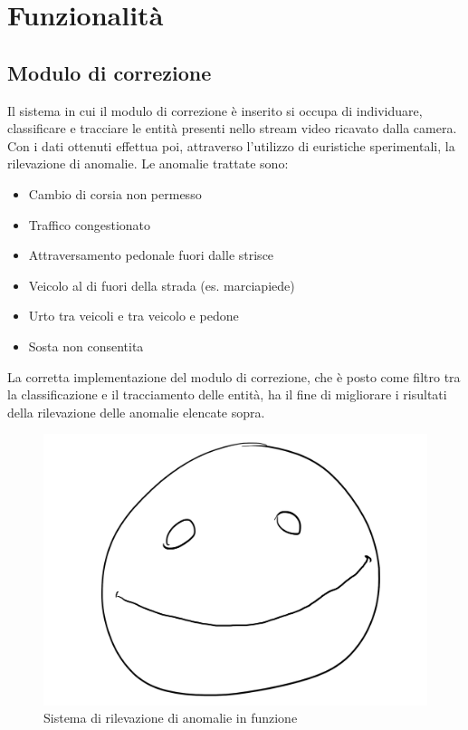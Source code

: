 \chapter{Funzionalità}
\label{sec:funzionalita}

\section{Modulo di correzione}
Il sistema in cui il modulo di correzione è inserito si occupa di individuare, classificare e tracciare le entità presenti nello stream video ricavato dalla camera.
Con i dati ottenuti effettua poi, attraverso l'utilizzo di euristiche sperimentali, la rilevazione di anomalie.
Le anomalie trattate sono:
\begin{itemize}
    \item Cambio di corsia non permesso
    \item Traffico congestionato
    \item Attraversamento pedonale fuori dalle strisce 
    \item Veicolo al di fuori della strada (es. marciapiede) %
    \item Urto tra veicoli e tra veicolo e pedone
    \item Sosta non consentita
\end{itemize}
La corretta implementazione del modulo di correzione, che è posto come filtro tra la classificazione e il tracciamento delle entità, ha il fine di migliorare i risultati della rilevazione delle anomalie elencate sopra.

\begin{figure}
    \caption{Sistema di rilevazione di anomalie in funzione}
    \label{fig:anomalie}
    \centering
    \includegraphics[width=.66\textwidth]{images/placeholder.png}
\end{figure}


